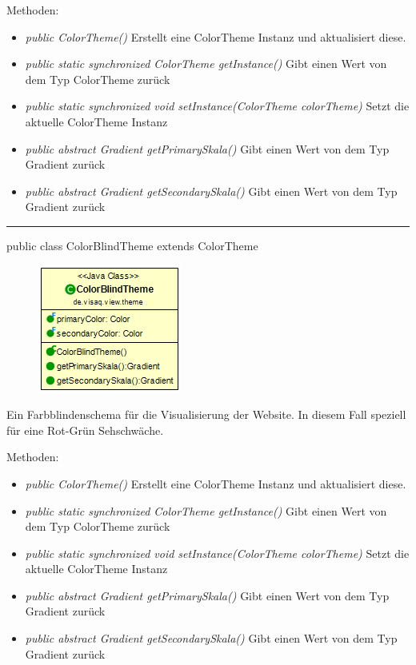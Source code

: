 Methoden:
\begin{itemize} 
    \item \emph{public ColorTheme()} Erstellt eine ColorTheme Instanz und aktualisiert diese.
    \item \emph{public static synchronized ColorTheme getInstance()} Gibt einen Wert von dem Typ ColorTheme zurück
    \item \emph{public static synchronized void setInstance(ColorTheme colorTheme)} Setzt die aktuelle ColorTheme Instanz    \item \emph{public abstract Gradient getPrimarySkala()} Gibt einen Wert von dem Typ Gradient zurück
    \item \emph{public abstract Gradient getSecondarySkala()}  Gibt einen Wert von dem Typ Gradient zurück
\end{itemize}

\rule{\textwidth}{0.4pt} 
public class ColorBlindTheme extends ColorTheme

\begin{minipage}{0.3\textwidth}
\begin{figure}[H]
    \includegraphics[scale = 0.5]{media/frontend/view/de.view.elements.theme/ColorBlindTheme_Class.png}
\end{figure}
\end{minipage} \hfill
\begin{minipage}{0.6\textwidth}
    Ein Farbblindenschema für die Visualisierung der Website. In diesem Fall speziell für eine Rot-Grün Sehschwäche.
\end{minipage}

Methoden:
\begin{itemize} 
    \item \emph{public ColorTheme()} Erstellt eine ColorTheme Instanz und aktualisiert diese.
    \item \emph{public static synchronized ColorTheme getInstance()} Gibt einen Wert von dem Typ ColorTheme zurück
    \item \emph{public static synchronized void setInstance(ColorTheme colorTheme)} Setzt die aktuelle ColorTheme Instanz
    \item \emph{public abstract Gradient getPrimarySkala()} Gibt einen Wert von dem Typ Gradient zurück
    \item \emph{public abstract Gradient getSecondarySkala()}  Gibt einen Wert von dem Typ Gradient zurück
\end{itemize}

